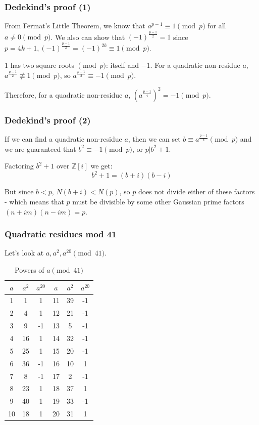 \documentclass{beamer}
\begin{document}
\begin{frame}
	\frametitle{Dedekind's proof (1)}

	From Fermat's Little Theorem, we know that $a^{p-1} \equiv 1 \pmod{p}$ for all
	$a\neq 0 \pmod{p}$. We also can show that $(-1)^{\frac{p-1}{2}} = 1$ since 
	$p = 4k+1, (-1)^{\frac{p-1}{2}} = (-1)^{2k} \equiv 1 \pmod{p}$.

	$1$ has two square roots $\pmod{p}$: itself and $-1$. For a quadratic non-residue $a$,
	$a^{\frac{p-1}{2}} \not \equiv 1 \pmod{p}$, so $a^{\frac{p-1}{2}} \equiv -1 \pmod{p}$.

	Therefore, for a quadratic non-residue $a$, $(a^{\frac{p-1}{4}})^2 = -1 \pmod{p}$.

\end{frame}

\begin{frame}
	\frametitle{Dedekind's proof (2)}

	If we can find a quadratic non-residue $a$, then we can set $b \equiv a^{\frac{p-1}{4}} \pmod{p}$
	and we are guaranteed that $b^2 \equiv -1 \pmod{p}$, or $p | b^2+1$.

	Factoring $b^2+1$ over $\mathbb{Z}[i]$ we get:
	\[b^2 + 1 = (b+i)(b-i) \]
	
	But since $b<p$, $N(b+i)<N(p)$, so $p$ does not divide either of these factors - which means
	that $p$ must be divisible by some other Gaussian prime factors $(n+im)(n-im) = p$.
\end{frame}

\begin{frame}
	\frametitle{Quadratic residues mod 41}

	Let's look at $a,a^2, a^{20} \pmod{41}$.

       \begin{table}
\begin{tabular}{| c | c | c || c | c | c ||}
        \hline
	$a$ & $a^2$ & $a^{20}$ & $a$ & $a^2$ & $a^{20}$ \\
	\hline
	1  & 1  & 1  & 11 & 39 & -1 \\
	2  & 4  & 1  & 12 & 21 & -1 \\
	3  & 9  & -1 & 13 & 5  & -1 \\
	4  & 16 & 1  & 14 & 32 & -1 \\
	5  & 25 & 1  & 15 & 20 & -1 \\
	6  & 36 & -1 & 16 & 10 & 1  \\
	7  & 8  & -1 & 17 & 2  & -1 \\
	8  & 23 & 1  & 18 & 37 & 1  \\
	9  & 40 & 1  & 19 & 33 & -1 \\
	10 & 18 & 1  & 20 & 31 & 1  \\
	\hline
\end{tabular}
	       \caption*{Powers of $a \pmod{41}$}
\end{table}

\end{frame}
\end{document}
